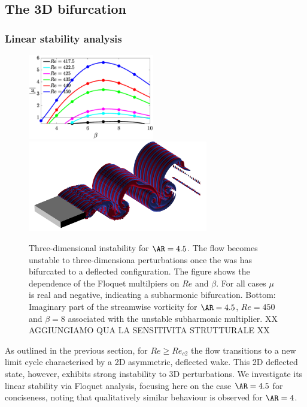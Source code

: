 \subsection{The 3D bifurcation}

\subsubsection{Linear stability analysis}

\begin{figure}
  \centering
  \includegraphics[width=0.49\textwidth]{./fig/AR4p5/multipliers_3D.eps}
  \includegraphics[trim={0 0 0 0},clip,width=0.7\textwidth]{./fig/AR4p5/Floqetmode_beta_8_Re450_AR4p5.png}  
  \caption{Three-dimensional instability for $\AR=4.5$. The flow becomes unstable to three-dimensiona perturbations once the was has bifurcated to a deflected configuration. The figure shows the dependence of the Floquet multilpiers on $Re$ and $\beta$. For all cases $\mu$ is real and negative, indicating a subharmonic bifurcation. Bottom: Imaginary part of the streamwise vorticity for $\AR=4.5$, $Re=450$ and $\beta=8$ associated with the unstable subharmonic multiplier. XX AGGIUNGIAMO QUA LA SENSITIVITA STRUTTURALE XX}
  \label{fig:mul-3d-ar4p5}
\end{figure}

As outlined in the previous section, for $Re \geq Re_{c2}$ the flow transitions to a new limit cycle characterised by a 2D asymmetric, deflected wake. This 2D deflected state, however, exhibits strong instability to 3D perturbations. We investigate its linear stability via Floquet analysis, focusing here on the case $\AR=4.5$ for conciseness, noting that qualitatively similar behaviour is observed for $\AR=4$.

